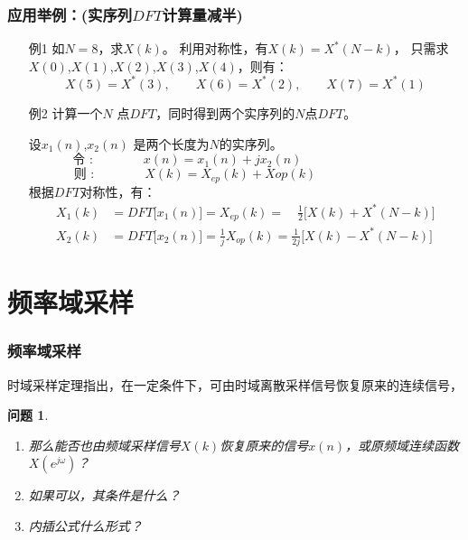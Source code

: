 \documentclass[notheorems,compress,mathserif,table]{beamer}
\newtheorem{wenti}{问题}
\begin{document}
\begin{frame}[allowframebreaks]\frametitle{ 应用举例：(实序列$DFT$计算量减半)}%

      \begin{enumerate}
        \item [例1] 如$N=8$，求$X(k)$。 \quad\newline\newline\quad
              利用对称性，有$X(k)=X^*(N-k)$，\quad\newline\newline\quad
              只需求$X(0)$,$X(1)$,$X(2)$,$X(3)$,$X(4)$，则有：
              $$X(5)=X^*(3),\quad\quad X(6)=X^*(2),\quad\quad X(7)= X^*(1)$$
        \newpage
        \item [例2] 计算一个$N$ 点$DFT$，同时得到两个实序列的$N$点$DFT$。
        
        \quad\newline\quad
              设$x_1(n)$,$x_2(n)$ 是两个长度为$N$的实序列。
              $$\mbox{令 :}\qquad\qquad x(n) = x_1(n)+jx_2(n)\quad\:
              \qquad\qquad\qquad\qquad$$
              $$\mbox{则 :}\qquad\qquad X(k) = X_{ep}(k) +X{op}(k)
              \qquad\qquad\qquad\qquad$$
              根据$DFT$对称性，有：
              \begin{equation*}
                \begin{split}
                X_1(k)  &= DFT\big[x_1(n)\big]   = X_{ep}(k) = \quad \frac{1}{2} \bigg[X(k) + X^{*}(N-k)\bigg]  \\
                X_2(k)  &= DFT\big[x_2(n)\big]   = \frac{1}{j}X_{op}(k) = \frac{1}{2j}\bigg[X(k) - X^{*}(N-k)\bigg]
                \end{split}
              \end{equation*}
      \end{enumerate}


\end{frame}


\section{频率域采样}
\begin{frame}[shrink]\frametitle{频率域采样}%


时域采样定理指出，在一定条件下，可由时域离散采样信号恢复原来的连续信号，

\begin{wenti}
\begin{enumerate}
	\item 那么能否也由频域采样信号$ X(k) $恢复原来的信号$ x(n) $，或原频域连续函数$ X(e^{j\omega}) $？
	\item 如果可以，其条件是什么？
	\item 内插公式什么形式？
\end{enumerate}
\end{wenti}
\end{frame}
\end{document}
